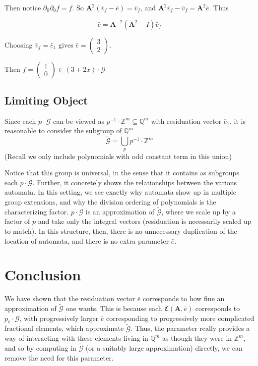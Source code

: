 \documentclass{article}
\newcommand{\G}{\mathcal{G}}
\newcommand{\C}{\mathfrak{C}(\Am,\e)}
\newcommand{\Z}{\mathbb{Z}}
\newcommand{\Q}{\mathbb{Q}}
\newcommand{\2}{\textbf{2}}
\newcommand{\Am}{\textbf{A}}
\newcommand{\del}{\partial}
\newcommand{\vv}{\bar{v}}
\newcommand{\e}{\bar{e}}
\theoremstyle{definition}
\begin{document}
Then notice $\del_0 \del_0 f = f$.
So $\Am^2 (\vv_f - \e) = \vv_f$, and
$\Am^2 \vv_f - \vv_f = \Am^2 \e$. Thus

\[ \e = \Am^{-2} (\Am^2 - I) \vv_f \]

Choosing $\vv_f = \e_1$ gives $\e = \begin{pmatrix} 3 \\ 2 \end{pmatrix}$.

Then $f = \begin{pmatrix} 1 \\ 0 \end{pmatrix} \in (3+2x) \cdot \G$

\subsection{Limiting Object}
Since each $p \cdot \G$ can be viewed as $p^{-1} \cdot \Z^m \subseteq \Q^m$
with residuation vector $\e_1$,
it is reasonable to consider the subgroup of $\Q^m$
\[ 
  \widetilde{\G} = \bigcup_p p^{-1} \cdot \Z^m 
\]
(Recall we only include polynomials with odd constant term in this union)

Notice that this group is universal, in the sense that it contains as
subgroups each $p \cdot \G$. Further, it concretely shows the relationships
between the various automata. In this setting, we see exactly why automata 
show up in multiple group extensions, and why the division ordering of 
polynomials is the characterizing factor. $p \cdot \G$ is an approximation
of $\widetilde{\G}$, where we scale up by a factor of $p$ and take only
the integral vectors (residuation is necessarily scaled up to match). 
In this structure, then, there is no unnecessary duplication of the location
of automata, and there is no extra parameter $\e$.

\section{Conclusion}
We have shown that the residuation vector $\e$ corresponds to how fine an
approximation of $\widetilde{\G}$ one wants. This is because each $\C$ 
corresponds to $p_{\e} \cdot \G$, with progressively larger $\e$ 
corresponding to progressively more complicated fractional elements, which
approximate $\widetilde{\G}$. Thus, the parameter really provides a way of
interacting with these elements living in $\Q^m$ as though they were in $\Z^m$,
and so by computing in $\widetilde{\G}$ (or a suitably large approximation) 
directly, we can remove the need for this parameter.
\end{document}
